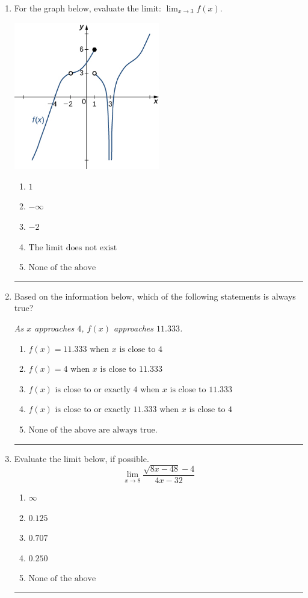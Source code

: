 \documentclass[14pt]{extbook}
\newcommand{\litem}[1]{\item#1\hspace*{-1cm}\rule{\textwidth}{0.4pt}}
\begin{document}
\begin{enumerate}
{\begin{enumerate}[label=\Alph*.]
\end{enumerate} }
\litem{
For the graph below, evaluate the limit: $ \displaystyle \lim_{x \rightarrow 3} f(x)$.
\begin{center}
    \includegraphics[width=0.5\textwidth]{../Figures/evaluateLimitGraphicallyC.png}
\end{center}
\begin{enumerate}[label=\Alph*.]
\item \( 1 \)
\item \( -\infty \)
\item \( -2 \)
\item \( \text{The limit does not exist} \)
\item \( \text{None of the above} \)

\end{enumerate} }
\litem{
Based on the information below, which of the following statements is always true?
\begin{center}
    \textit{ As $x$ approaches $4$, $f(x)$ approaches $11.333$. }
\end{center}
\begin{enumerate}[label=\Alph*.]
\item \( f(x) = 11.333 \text{ when } x \text{ is close to } 4 \)
\item \( f(x) = 4 \text{ when } x \text{ is close to } 11.333 \)
\item \( f(x) \text{ is close to or exactly } 4 \text{ when } x \text{ is close to } 11.333 \)
\item \( f(x) \text{ is close to or exactly } 11.333 \text{ when } x \text{ is close to } 4 \)
\item \( \text{None of the above are always true.} \)

\end{enumerate} }
\litem{
Evaluate the limit below, if possible.\[ \lim_{x \rightarrow 8} \frac{\sqrt{8x - 48} - 4}{4x - 32} \]\begin{enumerate}[label=\Alph*.]
\item \( \infty \)
\item \( 0.125 \)
\item \( 0.707 \)
\item \( 0.250 \)
\item \( \text{None of the above} \)


\end{enumerate}}
\end{enumerate}
\end{document}
